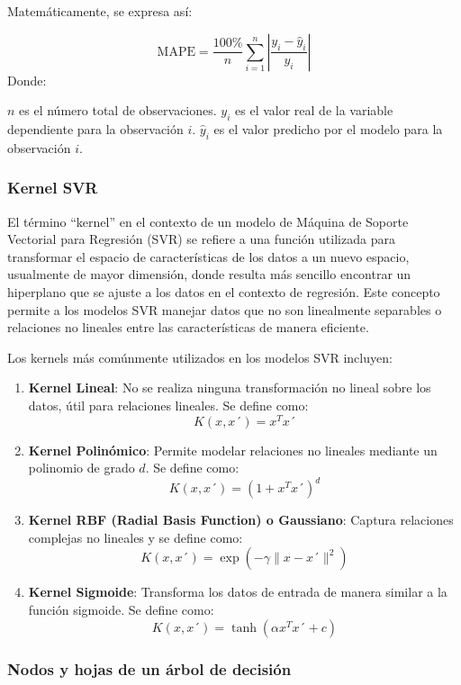 \documentclass[
  11pt,
  bookmarksnumbered]{article}
\begin{document}
Matemáticamente, se expresa así:

\[\text{MAPE} = \frac{100\%}{n} \sum_{i=1}^{n} \left|\frac{y_i - \hat{y}_i}{y_i}\right|\] Donde:

\(n\) es el número total de observaciones.
\(y_i\) es el valor real de la variable dependiente para la observación \(i\).
\(\hat{y}_i\) es el valor predicho por el modelo para la observación \(i\).

\hypertarget{kernel-svr}{%
\subsubsection{Kernel SVR}\label{kernel-svr}}

El término ``kernel'' en el contexto de un modelo de Máquina de Soporte Vectorial para Regresión (SVR) se refiere a una función utilizada para transformar el espacio de características de los datos a un nuevo espacio, usualmente de mayor dimensión, donde resulta más sencillo encontrar un hiperplano que se ajuste a los datos en el contexto de regresión.
Este concepto permite a los modelos SVR manejar datos que no son linealmente separables o relaciones no lineales entre las características de manera eficiente.

Los kernels más comúnmente utilizados en los modelos SVR incluyen:

\begin{enumerate}
\def\labelenumi{\arabic{enumi}.}
\item
  \textbf{Kernel Lineal}: No se realiza ninguna transformación no lineal sobre los datos, útil para relaciones lineales.
  Se define como: \[K(x, x´) = x^T x´\]
\item
  \textbf{Kernel Polinómico}: Permite modelar relaciones no lineales mediante un polinomio de grado \(d\).
  Se define como: \[K(x, x´) = (1 + x^T x´)^d\]
\item
  \textbf{Kernel RBF (Radial Basis Function) o Gaussiano}: Captura relaciones complejas no lineales y se define como: \[K(x, x´) = \exp(-\gamma \|x - x´\|^2)\]
\item
  \textbf{Kernel Sigmoide}: Transforma los datos de entrada de manera similar a la función sigmoide.
  Se define como: \[K(x, x´) = \tanh(\alpha x^T x´ + c)\]
\end{enumerate}

\hypertarget{nodos-y-hojas-de-un-uxe1rbol-de-decisiuxf3n}{%
\subsubsection{Nodos y hojas de un árbol de decisión}\label{nodos-y-hojas-de-un-uxe1rbol-de-decisiuxf3n}}
\end{document}
